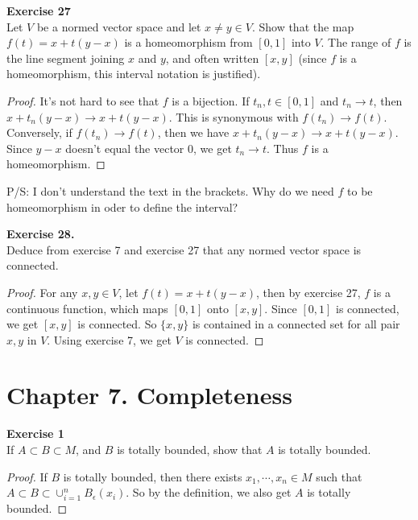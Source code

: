 \documentclass[12pt, a4paper]{article}
\theoremstyle{plain}
\newenvironment{exercise}[2][Exercise]
    { \begin{mdframed}[backgroundcolor=gray!20] \textbf{#1 #2} \\}
    {  \end{mdframed}}
\begin{document}
\begin{exercise}{27}
Let $V$ be a normed vector space and let $x\neq y\in V$. Show that the map $f(t)=x+t(y-x)$ is a homeomorphism from $[0,1]$ into $V$. The range of $f$ is the line segment joining $x$ and $y$, and often written $[x,y]$ (since $f$ is a homeomorphism, this interval notation is justified).
\end{exercise}
	\begin{proof}
	It's not hard to see that $f$ is a bijection. If $t_n,t\in [0,1]$ and $t_n\rightarrow t$, then $x+t_n(y-x)\rightarrow x+t(y-x)$. This is synonymous with $f(t_n)\rightarrow f(t)$. Conversely, if $f(t_n)\rightarrow f(t)$, then we have $x+t_n(y-x)\rightarrow x+t(y-x)$. Since $y-x$ doesn't equal the vector $0$, we get $t_n\rightarrow t$. Thus $f$ is a homeomorphism.
	\end{proof}
	P/S: I don't understand the text in the brackets. Why do we need $f$ to be homeomorphism in oder to define the interval?
	
\begin{exercise}{28.}
Deduce from exercise 7 and exercise 27 that any normed vector space is connected.
\end{exercise}
	\begin{proof}
	For any $x,y\in V$, let $f(t)=x+t(y-x)$, then by exercise 27, $f$ is a continuous function, which maps $[0,1]$ onto $[x,y]$. Since $[0,1]$ is connected, we get $[x,y]$ is connected. So $\{x,y\}$ is contained in a connected set for all pair $x,y$ in $V$. Using exercise 7, we get $V$ is connected.
	\end{proof}
	
\section*{Chapter 7. Completeness}

\begin{exercise}{1}
If $A\subset B\subset M$, and $B$ is totally bounded, show that $A$ is totally bounded.
\end{exercise}
	\begin{proof}
	If $B$ is totally bounded, then there exists $x_1,\cdots,x_n\in M$ such that $A\subset B\subset \cup_{i=1}^n{B_\epsilon(x_i)}$. So by the definition, we also get $A$ is totally bounded. 
	\end{proof}
	
\end{document}
